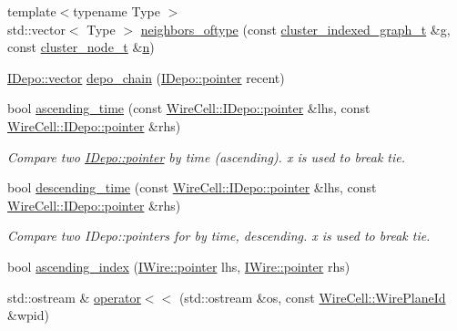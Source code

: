 \begin{DoxyCompactItemize}
\item 
{\footnotesize template$<$typename Type $>$ }\\std\+::vector$<$ Type $>$ \hyperlink{namespace_wire_cell_a11c40bd5197fa73c633ce987e1d284e4}{neighbors\+\_\+oftype} (const \hyperlink{namespace_wire_cell_a81d03e7272d04b607afc90bd3f7a9499}{cluster\+\_\+indexed\+\_\+graph\+\_\+t} \&g, const \hyperlink{struct_wire_cell_1_1cluster__node__t}{cluster\+\_\+node\+\_\+t} \&\hyperlink{format_8h_a9ab7e5832cef391eb8b1505a601fb215}{n})
\item 
\hyperlink{class_wire_cell_1_1_i_data_ae1a9f863380499bb43f39fabb6276660}{I\+Depo\+::vector} \hyperlink{namespace_wire_cell_a78bd389d29c322c5a6822bee8581ee73}{depo\+\_\+chain} (\hyperlink{class_wire_cell_1_1_i_data_aff870b3ae8333cf9265941eef62498bc}{I\+Depo\+::pointer} recent)
\item 
bool \hyperlink{namespace_wire_cell_a294987a743cfdf49097f1215ac70ab66}{ascending\+\_\+time} (const \hyperlink{class_wire_cell_1_1_i_data_aff870b3ae8333cf9265941eef62498bc}{Wire\+Cell\+::\+I\+Depo\+::pointer} \&lhs, const \hyperlink{class_wire_cell_1_1_i_data_aff870b3ae8333cf9265941eef62498bc}{Wire\+Cell\+::\+I\+Depo\+::pointer} \&rhs)
\begin{DoxyCompactList}\small\item\em Compare two \hyperlink{class_wire_cell_1_1_i_data_aff870b3ae8333cf9265941eef62498bc}{I\+Depo\+::pointer} by time (ascending). x is used to break tie. \end{DoxyCompactList}\item 
bool \hyperlink{namespace_wire_cell_a8cd3697f742b73810ac49feb370e4a04}{descending\+\_\+time} (const \hyperlink{class_wire_cell_1_1_i_data_aff870b3ae8333cf9265941eef62498bc}{Wire\+Cell\+::\+I\+Depo\+::pointer} \&lhs, const \hyperlink{class_wire_cell_1_1_i_data_aff870b3ae8333cf9265941eef62498bc}{Wire\+Cell\+::\+I\+Depo\+::pointer} \&rhs)
\begin{DoxyCompactList}\small\item\em Compare two I\+Depo\+::pointers for by time, descending. x is used to break tie. \end{DoxyCompactList}\item 
bool \hyperlink{namespace_wire_cell_a3e32120de947bdb96c9d47747170d90d}{ascending\+\_\+index} (\hyperlink{class_wire_cell_1_1_i_data_aff870b3ae8333cf9265941eef62498bc}{I\+Wire\+::pointer} lhs, \hyperlink{class_wire_cell_1_1_i_data_aff870b3ae8333cf9265941eef62498bc}{I\+Wire\+::pointer} rhs)
\item 
std\+::ostream \& \hyperlink{namespace_wire_cell_a470282420df828d72316462cefed8139}{operator$<$$<$} (std\+::ostream \&os, const \hyperlink{class_wire_cell_1_1_wire_plane_id}{Wire\+Cell\+::\+Wire\+Plane\+Id} \&wpid)

\end{DoxyCompactItemize}
